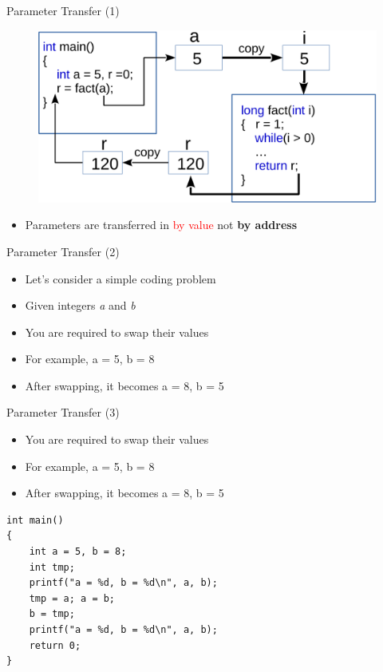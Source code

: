 \begin{frame}[fragile]{Parameter Transfer (1)}
\begin{figure}
	\includegraphics[width=0.85\linewidth]{figs/arg2para.pdf}
\end{figure}
\begin{itemize}
	\item {Parameters are transferred in \textcolor{red}{by value} not \textbf{by address}}
\end{itemize}
\end{frame}

\begin{frame}[fragile]{Parameter Transfer (2)}
\begin{itemize}
	\item {Let's consider a simple coding problem}
	\item {Given integers \textit{a} and \textit{b}}
	\item {You are required to swap their values}
	\item {For example, a = 5, b = 8}
	\item {After swapping, it becomes a = 8, b = 5}
\end{itemize}

\end{frame}

\begin{frame}[fragile]{Parameter Transfer (3)}
\begin{itemize}
	\item {You are required to swap their values}
	\item {For example, a = 5, b = 8}
	\item {After swapping, it becomes a = 8, b = 5}
\end{itemize}
\begin{lstlisting}
int main()
{
    int a = 5, b = 8;
    int tmp;
    printf("a = %d, b = %d\n", a, b);
    tmp = a; a = b;
    b = tmp;
    printf("a = %d, b = %d\n", a, b);
    return 0;
}
\end{lstlisting}

\end{frame}

